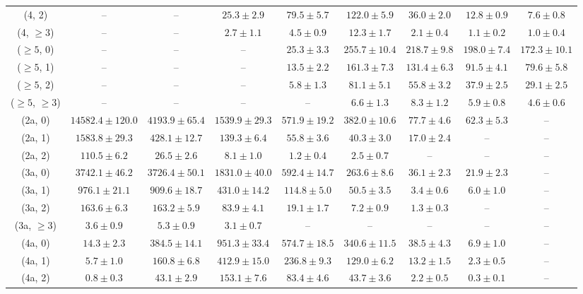 \begin{table}[h!]
{\begin{tabular}{ccccccccc}
	(4, 2) & -- & -- & $25.3\pm 2.9$ & $79.5\pm 5.7$ & $122.0\pm 5.9$ & $36.0\pm 2.0$ & $12.8\pm 0.9$ & $7.6\pm 0.8$ \\[0.5ex] 
	(4, $\ge3$) & -- & -- & $2.7\pm 1.1$ & $4.5\pm 0.9$ & $12.3\pm 1.7$ & $2.1\pm 0.4$ & $1.1\pm 0.2$ & $1.0\pm 0.4$ \\[0.5ex] 
	($\ge5$, 0) & -- & -- & -- & $25.3\pm 3.3$ & $255.7\pm 10.4$ & $218.7\pm 9.8$ & $198.0\pm 7.4$ & $172.3\pm 10.1$ \\[0.5ex] 
	($\ge5$, 1) & -- & -- & -- & $13.5\pm 2.2$ & $161.3\pm 7.3$ & $131.4\pm 6.3$ & $91.5\pm 4.1$ & $79.6\pm 5.8$ \\[0.5ex] 
	($\ge5$, 2) & -- & -- & -- & $5.8\pm 1.3$ & $81.1\pm 5.1$ & $55.8\pm 3.2$ & $37.9\pm 2.5$ & $29.1\pm 2.5$ \\[0.5ex] 
	($\ge5$, $\ge3$) & -- & -- & -- & -- & $6.6\pm 1.3$ & $8.3\pm 1.2$ & $5.9\pm 0.8$ & $4.6\pm 0.6$ \\[0.5ex] 
	(2a, 0) & $14582.4\pm 120.0$ & $4193.9\pm 65.4$ & $1539.9\pm 29.3$ & $571.9\pm 19.2$ & $382.0\pm 10.6$ & $77.7\pm 4.6$ & $62.3\pm 5.3$ & -- \\[0.5ex] 
	(2a, 1) & $1583.8\pm 29.3$ & $428.1\pm 12.7$ & $139.3\pm 6.4$ & $55.8\pm 3.6$ & $40.3\pm 3.0$ & $17.0\pm 2.4$ & -- & -- \\[0.5ex] 
	(2a, 2) & $110.5\pm 6.2$ & $26.5\pm 2.6$ & $8.1\pm 1.0$ & $1.2\pm 0.4$ & $2.5\pm 0.7$ & -- & -- & -- \\[0.5ex] 
	(3a, 0) & $3742.1\pm 46.2$ & $3726.4\pm 50.1$ & $1831.0\pm 40.0$ & $592.4\pm 14.7$ & $263.6\pm 8.6$ & $36.1\pm 2.3$ & $21.9\pm 2.3$ & -- \\[0.5ex] 
	(3a, 1) & $976.1\pm 21.1$ & $909.6\pm 18.7$ & $431.0\pm 14.2$ & $114.8\pm 5.0$ & $50.5\pm 3.5$ & $3.4\pm 0.6$ & $6.0\pm 1.0$ & -- \\[0.5ex] 
	(3a, 2) & $163.6\pm 6.3$ & $163.2\pm 5.9$ & $83.9\pm 4.1$ & $19.1\pm 1.7$ & $7.2\pm 0.9$ & $1.3\pm 0.3$ & -- & -- \\[0.5ex] 
	(3a, $\ge3$) & $3.6\pm 0.9$ & $5.3\pm 0.9$ & $3.1\pm 0.7$ & -- & -- & -- & -- & -- \\[0.5ex] 
	(4a, 0) & $14.3\pm 2.3$ & $384.5\pm 14.1$ & $951.3\pm 33.4$ & $574.7\pm 18.5$ & $340.6\pm 11.5$ & $38.5\pm 4.3$ & $6.9\pm 1.0$ & -- \\[0.5ex] 
	(4a, 1) & $5.7\pm 1.0$ & $160.8\pm 6.8$ & $412.9\pm 15.0$ & $236.8\pm 9.3$ & $129.0\pm 6.2$ & $13.2\pm 1.5$ & $2.3\pm 0.5$ & -- \\[0.5ex] 
	(4a, 2) & $0.8\pm 0.3$ & $43.1\pm 2.9$ & $153.1\pm 7.6$ & $83.4\pm 4.6$ & $43.7\pm 3.6$ & $2.2\pm 0.5$ & $0.3\pm 0.1$ & -- \\[0.5ex] 

\end{tabular}}
\end{table}
